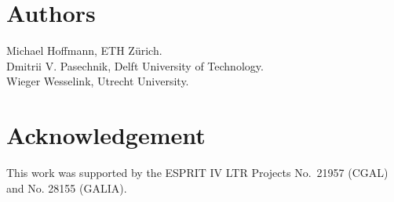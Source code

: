 
\pagestyle{plain}
\setcounter{page}{1}
\newpage


\lcTex{\vspace*{2cm}}

\section*{Authors}

Michael Hoffmann, ETH Z\"urich.\\
Dmitrii V. Pasechnik, Delft University of Technology.\\
Wieger Wesselink, Utrecht University.

\section*{Acknowledgement}

This work was supported by the ESPRIT IV LTR Projects No.~21957 (CGAL)
and No. 28155 (GALIA).

